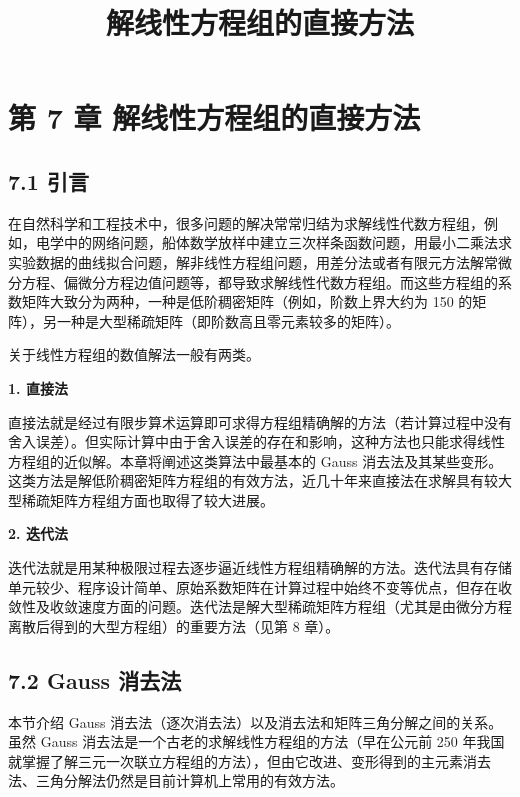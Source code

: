 \documentclass[
  10pt,
  fontset=fandol]{ctexart}
\title{解线性方程组的直接方法}
\author{}
\date{}
\begin{document}
\maketitle

\section{第 7 章 解线性方程组的直接方法}\label{ux7b2c-7-ux7ae0-ux89e3ux7ebfux6027ux65b9ux7a0bux7ec4ux7684ux76f4ux63a5ux65b9ux6cd5}

\subsection{7.1 引言}\label{ux5f15ux8a00}

在自然科学和工程技术中，很多问题的解决常常归结为求解线性代数方程组，例如，电学中的网络问题，船体数学放样中建立三次样条函数问题，用最小二乘法求实验数据的曲线拟合问题，解非线性方程组问题，用差分法或者有限元方法解常微分方程、偏微分方程边值问题等，都导致求解线性代数方程组。而这些方程组的系数矩阵大致分为两种，一种是低阶稠密矩阵（例如，阶数上界大约为 150 的矩阵），另一种是大型稀疏矩阵（即阶数高且零元素较多的矩阵）。

关于线性方程组的数值解法一般有两类。

\textbf{1. 直接法}

直接法就是经过有限步算术运算即可求得方程组精确解的方法（若计算过程中没有舍入误差）。但实际计算中由于舍入误差的存在和影响，这种方法也只能求得线性方程组的近似解。本章将阐述这类算法中最基本的 Gauss 消去法及其某些变形。这类方法是解低阶稠密矩阵方程组的有效方法，近几十年来直接法在求解具有较大型稀疏矩阵方程组方面也取得了较大进展。

\textbf{2. 迭代法}

迭代法就是用某种极限过程去逐步逼近线性方程组精确解的方法。迭代法具有存储单元较少、程序设计简单、原始系数矩阵在计算过程中始终不变等优点，但存在收敛性及收敛速度方面的问题。迭代法是解大型稀疏矩阵方程组（尤其是由微分方程离散后得到的大型方程组）的重要方法（见第 8 章）。

\subsection{7.2 Gauss 消去法}\label{gauss-ux6d88ux53bbux6cd5}

本节介绍 Gauss 消去法（逐次消去法）以及消去法和矩阵三角分解之间的关系。虽然 Gauss 消去法是一个古老的求解线性方程组的方法（早在公元前 250 年我国就掌握了解三元一次联立方程组的方法），但由它改进、变形得到的主元素消去法、三角分解法仍然是目前计算机上常用的有效方法。
\end{document}

